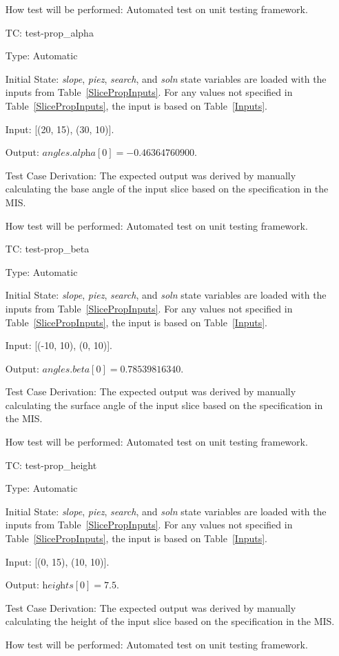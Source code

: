 \documentclass[12pt, titlepage]{article}
\newcounter{utestnum} %
\begin{document}
\begin{enumerate}[label=TC\arabic*:,ref={\arabic*}]
	How test will be performed: Automated test on unit testing framework.
	
	\item [TC\refstepcounter{utestnum}\theutestnum: 
	\label{TC_PropertyAlpha}] 
	test-prop\_alpha
	
	Type: Automatic
	
	Initial State: \textit{slope}, \textit{piez}, \textit{search}, and 
	\textit{soln} state variables are loaded with the inputs from 
	Table~\ref{SlicePropInputs}. For any values not specified in 
	Table~\ref{SlicePropInputs}, the input is based on Table~\ref{Inputs}.
	
	Input: [(20, 15), (30, 10)].
	
	Output: $\textit{angles.alpha}[0] = -0.46364760900$.
	
	Test Case Derivation: The expected output was derived by manually 
	calculating the base angle of the input slice based on the specification in 
	the MIS.
	
	How test will be performed: Automated test on unit testing framework.
	
	\item [TC\refstepcounter{utestnum}\theutestnum: 
	\label{TC_PropertyBeta}] 
	test-prop\_beta
	
	Type: Automatic
	
	Initial State: \textit{slope}, \textit{piez}, \textit{search}, and 
	\textit{soln} state variables are loaded with the inputs from 
	Table~\ref{SlicePropInputs}. For any values not specified in 
	Table~\ref{SlicePropInputs}, the input is based on Table~\ref{Inputs}.
	
	Input: [(-10, 10), (0, 10)].
	
	Output: $\textit{angles.beta}[0] = 0.78539816340$.
	
	Test Case Derivation: The expected output was derived by manually 
	calculating the surface angle of the input slice based on the specification 
	in the MIS.
	
	How test will be performed: Automated test on unit testing framework.
	
	\item [TC\refstepcounter{utestnum}\theutestnum: 
	\label{TC_PropertyHeight}] 
	test-prop\_height
	
	Type: Automatic
	
	Initial State: \textit{slope}, \textit{piez}, \textit{search}, and 
	\textit{soln} state variables are loaded with the inputs from 
	Table~\ref{SlicePropInputs}. For any values not specified in 
	Table~\ref{SlicePropInputs}, the input is based on Table~\ref{Inputs}.
	
	Input: [(0, 15), (10, 10)].
	
	Output: $\textit{heights}[0] = 7.5$.
	
	Test Case Derivation: The expected output was derived by manually 
	calculating the height of the input slice based on the specification in the 
	MIS.
	
	How test will be performed: Automated test on unit testing framework.
	
\end{enumerate}
\end{document}
